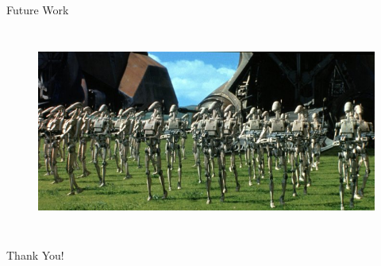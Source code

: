 \documentclass{beamer}
\begin{document}
\begin{frame}{Future Work}
\begin{columns}[c c]
				\begin{figure}
					\includegraphics[width=\columnwidth]{sm_eog_droid_army.jpg}
					\label{Roomba}
				\end{figure}

		\end{columns}

	\end{frame}


	\begin{frame}{}
		\vspace{24pt}
		\begin{center}
			\Huge{Thank You!}
		\end{center}
	\end{frame}





\end{document}
